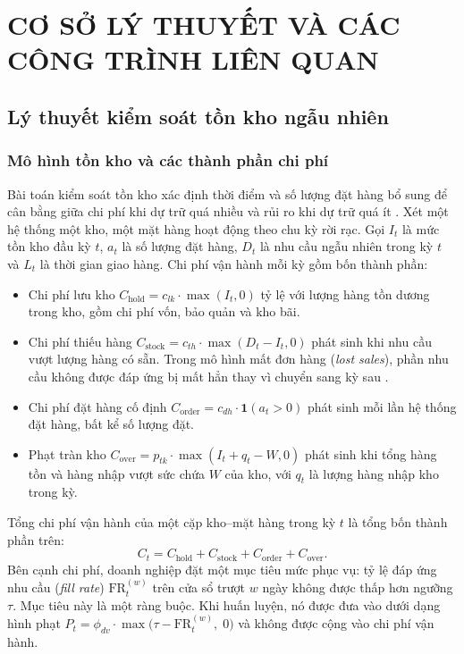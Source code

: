 \chapter{CƠ SỞ LÝ THUYẾT VÀ CÁC CÔNG TRÌNH LIÊN QUAN}
\label{chap:chapter2}

\section{Lý thuyết kiểm soát tồn kho ngẫu nhiên}
\label{sec:lyThuyetTonKho}

\subsection{Mô hình tồn kho và các thành phần chi phí}
\label{subsec:moHinhTonKho}

Bài toán kiểm soát tồn kho xác định thời điểm và số lượng đặt hàng bổ sung để cân bằng giữa chi phí khi dự trữ quá nhiều và rủi ro khi dự trữ quá ít \parencite{zipkin2000}. Xét một hệ thống một kho, một mặt hàng hoạt động theo chu kỳ rời rạc. Gọi $I_t$ là mức tồn kho đầu kỳ $t$, $a_t$ là số lượng đặt hàng, $D_t$ là nhu cầu ngẫu nhiên trong kỳ $t$ và $L_t$ là thời gian giao hàng. Chi phí vận hành mỗi kỳ gồm bốn thành phần:
\begin{itemize}
    \item Chi phí lưu kho $C_{\text{hold}} = c_{lk} \cdot \max(I_t, 0)$ tỷ lệ với lượng hàng tồn dương trong kho, gồm chi phí vốn, bảo quản và kho bãi.
    \item Chi phí thiếu hàng $C_{\text{stock}} = c_{th} \cdot \max(D_t - I_t, 0)$ phát sinh khi nhu cầu vượt lượng hàng có sẵn. Trong mô hình mất đơn hàng (\textit{lost sales}), phần nhu cầu không được đáp ứng bị mất hẳn thay vì chuyển sang kỳ sau \parencite{zipkin2008}.
    \item Chi phí đặt hàng cố định $C_{\text{order}} = c_{dh} \cdot \mathbf{1}(a_t > 0)$ phát sinh mỗi lần hệ thống đặt hàng, bất kể số lượng đặt.
    \item Phạt tràn kho $C_{\text{over}} = p_{tk} \cdot \max(I_t + q_t - W, 0)$ phát sinh khi tổng hàng tồn và hàng nhập vượt sức chứa $W$ của kho, với $q_t$ là lượng hàng nhập kho trong kỳ.
\end{itemize}

Tổng chi phí vận hành của một cặp kho--mặt hàng trong kỳ $t$ là tổng bốn thành phần trên:
\begin{equation}
    C_t = C_{\text{hold}} + C_{\text{stock}} + C_{\text{order}} + C_{\text{over}}.
    \label{eq:tongchiphi}
\end{equation}
Bên cạnh chi phí, doanh nghiệp đặt một mục tiêu mức phục vụ: tỷ lệ đáp ứng nhu cầu (\textit{fill rate}) $\text{FR}_t^{(w)}$ trên cửa sổ trượt $w$ ngày không được thấp hơn ngưỡng $\tau$. Mục tiêu này là một ràng buộc. Khi huấn luyện, nó được đưa vào dưới dạng hình phạt $P_t = \phi_{dv} \cdot \max\bigl(\tau - \text{FR}_t^{(w)},\; 0\bigr)$ và không được cộng vào chi phí vận hành.

